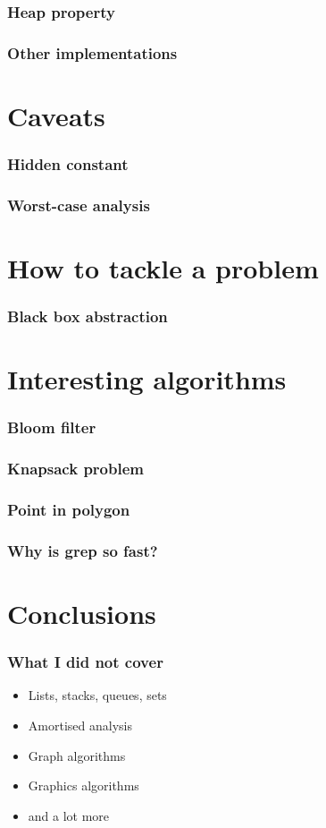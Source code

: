 \documentclass{beamer}
\begin{document}
\begin{frame}
 \frametitle{Heap property}
\end{frame}

\begin{frame}
 \frametitle{Other implementations}
\end{frame}

\section{Caveats}

\begin{frame}
 \frametitle{Hidden constant}
\end{frame}

\begin{frame}
 \frametitle{Worst-case analysis}
\end{frame}

\section{How to tackle a problem}

\begin{frame}
 \frametitle{Black box abstraction}
\end{frame}

\section{Interesting algorithms}

\begin{frame}
 \frametitle{Bloom filter}
\end{frame}

\begin{frame}
 \frametitle{Knapsack problem}
\end{frame}

\begin{frame}
 \frametitle{Point in polygon}
\end{frame}

\begin{frame}
 \frametitle{Why is grep so fast?}
\end{frame}

\section{Conclusions}

\begin{frame}
 \frametitle{What I did not cover}
 \begin{itemize}
  \item Lists, stacks, queues, sets
  \item Amortised analysis
  \item Graph algorithms
  \item Graphics algorithms
  \item and a lot more
 \end{itemize}
\end{frame}
\end{document}
